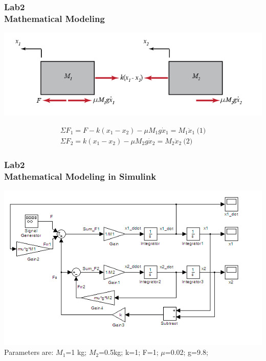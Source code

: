 \documentclass[hyperref={pdfpagelabels=true}]{beamer}
\begin{document}
\begin{frame}
\frametitle{Lab2 \\{\large Mathematical Modeling}}
\includegraphics[scale = 0.43]{figs/Selection_038.png}

\begin{align*}
 \Sigma F_1 = F - k(x_1 - x_2) - \mu M_1 g \dot{x}_1 = M_1 \ddot{x}_1 \  \text{(1)}\\
 \Sigma F_2 = k(x_1 - x_2) - \mu M_2 g \dot{x}_2 = M_2 \ddot{x}_2  \ \text{(2)}
\end{align*}
\end{frame}

\begin{frame}
\frametitle{Lab2 \\{\large Mathematical Modeling in Simulink}}
\includegraphics[scale = 0.51]{figs/Selection_039.png}
\\
Parameters are:
$M_1$=1 kg; $M_2$=0.5kg; k=1; F=1; $\mu$=0.02; g=9.8; 
\end{frame}
\end{document}
